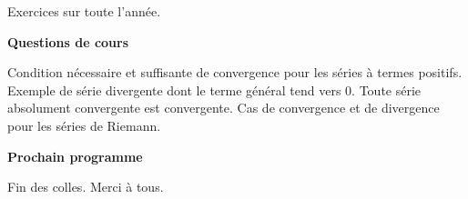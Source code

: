 






Exercices sur toute l'année.

\bigskip
\begin{center}
 \textbf{Questions de cours}
\end{center}
Condition nécessaire et suffisante de convergence pour les séries à termes positifs. Exemple de série divergente dont le terme général tend vers 0. Toute série absolument convergente est convergente. Cas de convergence et de divergence pour les séries de Riemann. 
\begin{center}
 \textbf{Prochain programme}
\end{center}
Fin des colles. Merci à tous.

